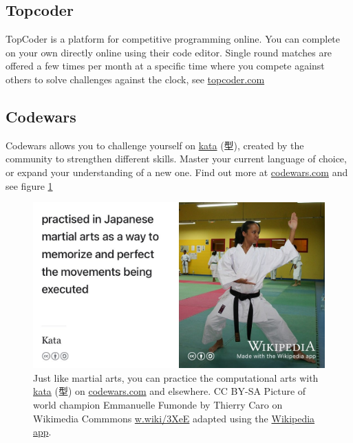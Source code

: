 \documentclass[
]{book}
\begin{document}
\hypertarget{topcoder}{%
\subsection{Topcoder}\label{topcoder}}

TopCoder is a platform for competitive programming online. You can complete on your own directly online using their code editor. Single round matches are offered a few times per month at a specific time where you compete against others to solve challenges against the clock, see \href{https://www.topcoder.com/}{topcoder.com}

\hypertarget{codewars}{%
\subsection{Codewars}\label{codewars}}

Codewars allows you to challenge yourself on \href{https://en.wikipedia.org/wiki/Kata}{kata} (型), created by the community to strengthen different skills. Master your current language of choice, or expand your understanding of a new one. Find out more at \href{https://www.codewars.com}{codewars.com} and see figure \ref{fig:codewars-kata-fig}

\begin{figure}

{\centering \includegraphics[width=0.99\linewidth]{images/kata} 

}

\caption{Just like martial arts, you can practice the computational arts with \href{https://en.wikipedia.org/wiki/Kata}{kata} (型) on \href{https://www.codewars.com}{codewars.com} and elsewhere. CC BY-SA Picture of world champion Emmanuelle Fumonde by Thierry Caro on Wikimedia Commmons \href{https://w.wiki/3XeE}{w.wiki/3XeE} adapted using the \href{https://apps.apple.com/us/app/wikipedia/id324715238}{Wikipedia app}.}\label{fig:codewars-kata-fig}
\end{figure}
\end{document}
